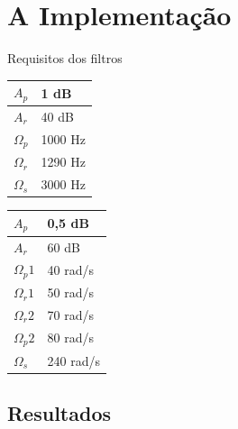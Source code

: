 \documentclass{beamer}
\begin{document}
\section{A Implementa\c{c}\~ao}
	\begin{frame}{Requisitos dos filtros}
		\begin{table}[ht]
			\begin{tabular}{|l|l|}
				\hline
				\(A_p\) 	& 1 dB		\\ \hline
				\(A_r\) 	& 40 dB		\\ \hline
				\(\Omega_p\) 	& 1000 Hz	\\ \hline
				\(\Omega_r\) 	& 1290 Hz	\\ \hline
				\(\Omega_s\) 	& 3000 Hz	\\ \hline
			\end{tabular}
			\label{tab:tabfiltro1}\quad
		
			\begin{tabular}{|l|l|}
				\hline
				\(A_p\) 	& 0,5 dB	\\ \hline
				\(A_r\) 	& 60 dB		\\ \hline
				\(\Omega_p1\) 	& 40 rad/s	\\ \hline
				\(\Omega_r1\) 	& 50 rad/s	\\ \hline
				\(\Omega_r2\) 	& 70 rad/s	\\ \hline
				\(\Omega_p2\) 	& 80 rad/s	\\ \hline
				\(\Omega_s\) 	& 240 rad/s	\\ \hline
			\end{tabular}
			\label{tab:tabfiltro2}
		\end{table}

	\end{frame}
  
\subsection{Resultados}
\end{document}
